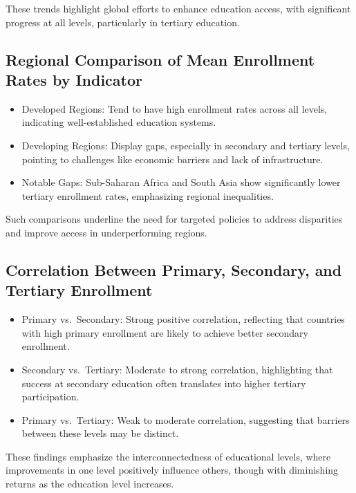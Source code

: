 \documentclass[
  letterpaper,
  DIV=11,
  numbers=noendperiod]{scrartcl}
\providecommand{\tightlist}{%
  \setlength{\itemsep}{0pt}\setlength{\parskip}{0pt}}\usepackage{longtable,booktabs,array}
\begin{document}
These trends highlight global efforts to enhance education access, with
significant progress at all levels, particularly in tertiary education.

\subsection{Regional Comparison of Mean Enrollment Rates by
Indicator}\label{regional-comparison-of-mean-enrollment-rates-by-indicator-1}

\begin{itemize}
\tightlist
\item
  Developed Regions: Tend to have high enrollment rates across all
  levels, indicating well-established education systems.
\item
  Developing Regions: Display gaps, especially in secondary and tertiary
  levels, pointing to challenges like economic barriers and lack of
  infrastructure.
\item
  Notable Gaps: Sub-Saharan Africa and South Asia show significantly
  lower tertiary enrollment rates, emphasizing regional inequalities.
\end{itemize}

Such comparisons underline the need for targeted policies to address
disparities and improve access in underperforming regions.

\subsection{Correlation Between Primary, Secondary, and Tertiary
Enrollment}\label{correlation-between-primary-secondary-and-tertiary-enrollment-1}

\begin{itemize}
\tightlist
\item
  Primary vs.~Secondary: Strong positive correlation, reflecting that
  countries with high primary enrollment are likely to achieve better
  secondary enrollment.
\item
  Secondary vs.~Tertiary: Moderate to strong correlation, highlighting
  that success at secondary education often translates into higher
  tertiary participation.
\item
  Primary vs.~Tertiary: Weak to moderate correlation, suggesting that
  barriers between these levels may be distinct.
\end{itemize}

These findings emphasize the interconnectedness of educational levels,
where improvements in one level positively influence others, though with
diminishing returns as the education level increases. \hspace{0pt}
\end{document}
